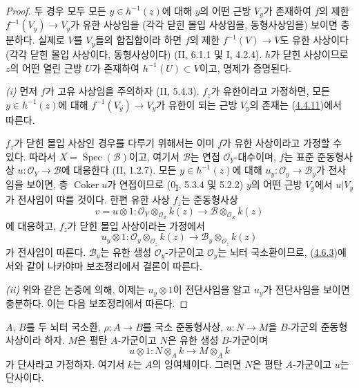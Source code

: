\begin{proof}
두 경우 모두 모든 $y\in h^{-1}(z)$에 대해 $y$의 어떤 근방
$V_y$가 존재하여 $f$의 제한 $f^{-1}(V_y)\to V_y$가 유한
사상임을 (각각 닫힌 몰입 사상임을, 동형사상임을) 보이면 충분하다.
실제로 $V$를 $V_y$들의 합집합이라 하면 $f$의 제한
$f^{-1}(V)\to V$도 유한 사상이다 (각각 닫힌 몰입 사상이다,
동형사상이다) (II, 6.1.1 및 I, 4.2.4). $h$가 닫힌 사상이므로
$z$의 어떤 열린 근방 $U$가 존재하여 $h^{-1}(U)\subset V$이고,
명제가 증명된다.

\noindent\textit{(i)}
먼저 $f$가 고유 사상임을 주의하자 (II, 5.4.3). $f_z$가 유한이라고
가정하면, 모든 $y\in h^{-1}(z)$에 대해
$f^{-1}(V_y)\to V_y$가 유한이 되는 근방 $V_y$의 존재는
(\hyperref[III.4.4.11-fr]{4.4.11})에서 따른다.


$f_z$가 닫힌 몰입 사상인 경우를 다루기 위해서는 이미 $f$가 유한
사상이라고 가정할 수 있다. 따라서
$X=\operatorname{Spec}(\mathcal B)$이고, 여기서 $\mathcal B$는 연접
$\mathcal O_Y$-대수이며, $f$는 표준 준동형사상
$u:\mathcal O_Y\to\mathcal B$에 대응한다 (II, 1.2.7).
모든 $y\in h^{-1}(z)$에 대해
$u_y:\mathcal O_y\to\mathcal B_y$가 전사임을 보이면, 층
$\operatorname{Coker}u$가 연접이므로 (0\textsubscript{I}, 5.3.4
및 5.2.2) $y$의 어떤 근방 $V_y$에서 $u|V_y$가 전사임이 따를
것이다. 한편 유한 사상 $f_z$는 준동형사상
\[
v=u\otimes1:
\mathcal O_Y\otimes_{\mathcal O_Z}k(z)
\longrightarrow
\mathcal B\otimes_{\mathcal O_Z}k(z)
\]
에 대응하고, $f_z$가 닫힌 몰입 사상이라는 가정에서
\[
u_y\otimes1:
\mathcal O_y\otimes_{\mathcal O_z}k(z)
\longrightarrow
\mathcal B_y\otimes_{\mathcal O_z}k(z)
\]
가 전사임이 따른다. $\mathcal B_y$는 유한 생성
$\mathcal O_y$-가군이고 $\mathcal O_y$는 뇌터 국소환이므로,
(\hyperref[III.4.6.3-fr]{4.6.3})에서와 같이 나카야마 보조정리에서
결론이 따른다.

\noindent\textit{(ii)}
위와 같은 논증에 의해, 이제는 $u_y\otimes1$이 전단사임을 알고
$u_y$가 전단사임을 보이면 충분하다. 이는 다음 보조정리에서 따른다.
\end{proof}

\begin{lemma}[4.6.7.1]
\label{III.4.6.7.1-fr}
$A$, $B$를 두 뇌터 국소환, $\rho:A\to B$를 국소 준동형사상,
$u:N\to M$을 $B$-가군의 준동형사상이라 하자. $M$은 평탄
$A$-가군이고 $N$은 유한 생성 $B$-가군이며
\[
u\otimes1:N\otimes_Ak\longrightarrow M\otimes_Ak
\]
가 단사라고 가정하자. 여기서 $k$는 $A$의 잉여체이다. 그러면
$N$은 평탄 $A$-가군이고 $u$는 단사이다.
\end{lemma}

